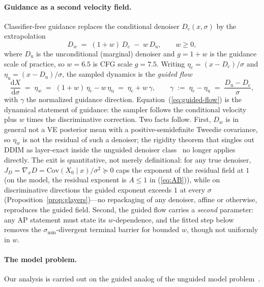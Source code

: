 \documentclass{article} %
\def\eqref#1{equation~\ref{#1}}
\def\Eqref#1{Equation~\ref{#1}}
\theoremstyle{plain}
\theoremstyle{definition}
\theoremstyle{remark}
\providecommand{\dd}{\mathrm{d}}
\providecommand{\smin}{\sigma_{\min}}
\providecommand{\Dc}{D_{\mathrm{c}}}
\providecommand{\Du}{D_{\mathrm{u}}}
\providecommand{\Dw}{D_{w}}
\providecommand{\etac}{\eta_{\mathrm{c}}}
\providecommand{\etau}{\eta_{\mathrm{u}}}
\providecommand{\etaw}{\eta_{w}}
\providecommand{\verify}[1]{} %
\def\eqref#1{(\ref{#1})}
\def\Eqref#1{Equation~(\ref{#1})}
\begin{document}
\paragraph{Guidance as a second velocity field.}
Classifier-free guidance \citep{hosalimans2022cfg} replaces the conditional
denoiser $\Dc(x,\sigma)$ by the extrapolation
\begin{equation}\label{eq:guided-denoiser}
  \Dw \;=\; (1+w)\,\Dc \;-\; w\,\Du,
  \qquad w \ge 0,
\end{equation}
where $\Du$ is the unconditional (marginal) denoiser and $g = 1+w$ is the
guidance scale of practice, so $w=6.5$ is CFG scale $g=7.5$. Writing $\etac = (x-\Dc)/\sigma$ and $\etau =
(x-\Du)/\sigma$, the sampled dynamics is the \emph{guided flow}
\begin{equation}\label{eq:guided-flow}
  \frac{\dd X}{\dd \sigma} \;=\; \etaw
  \;=\; (1+w)\,\etac - w\,\etau
  \;=\; \etac + w\,\gamma,
  \qquad
  \gamma \;:=\; \etac - \etau \;=\; \frac{\Du - \Dc}{\sigma},
\end{equation}
with $\gamma$ the normalized guidance direction. \Eqref{eq:guided-flow}
is the dynamical statement of guidance: the sampler
follows the conditional velocity plus $w$ times the discriminative
correction. Two facts follow. First, $\Dw$ is in
general not a VE posterior mean with a positive-semidefinite Tweedie
covariance, so $\etaw$ is not the residual of such a denoiser; the rigidity
theorem that singles out DDIM as layer-exact inside the
unguided denoiser class~\citep{ap2026} no longer applies directly. The exit is
quantitative, not merely definitional: for any true denoiser,
$J_D = \nabla_x D =
\mathrm{Cov}(X_0 \mid x)/\sigma^2 \succeq 0$ \citep{efron2011tweedie} caps
the exponent of the residual field at $1$ (on the model, the residual exponent
is $A \le 1$ in \eqref{eq:AB}), while on discriminative directions the guided
exponent exceeds $1$ at every $\sigma$
(Proposition~\ref{prop:glayers})---no repackaging of any denoiser, affine
or otherwise, reproduces the guided field.
Second, the guided flow carries a
\emph{second} parameter: any AP statement must state its $w$-dependence,
and the fitted step below removes the $\smin$-divergent terminal barrier
for bounded $w$, though not uniformly in $w$.

\paragraph{The model problem.}
Our analysis is carried out on the guided analog of the unguided model
problem~\citep{ap2026}.
\end{document}
